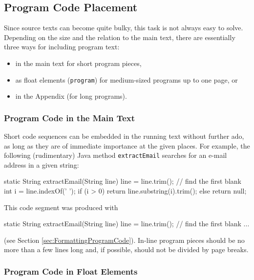 \subsection{Program Code Placement}

Since source texts can become quite bulky, this task is not always easy to
solve. Depending on the size and the relation to the main text, there are
essentially three ways for including program text:
%
\begin{itemize}
    \item[a)] in the main text for short program pieces,
    \item[b)] as float elements (\texttt{program}) for medium-sized programs
    up to one page, or
    \item[c)] in the Appendix (for long programs).
\end{itemize}


\subsubsection{Program Code in the Main Text}

Short code sequences can be embedded in the running text without further ado,
as long as they are of immediate importance at the given places.
For example, the following (rudimentary) Java method \texttt{extractEmail}
searches for an e-mail address in a given string:
%
\begin{JavaCode}[numbers=none]
static String extractEmail(String line) {
    line = line.trim(); // find the first blank
    int i = line.indexOf(' ');
    if (i > 0)
        return line.substring(i).trim();
    else
        return null;
}
\end{JavaCode}
%
\noindent
This code segment was produced with
%
\begin{LaTeXCode}[numbers=none]
\begin{JavaCode}[numbers=none]
static String extractEmail(String line) {
    line = line.trim(); // find the first blank
    ...
}
\end{JavaCode}
\end{LaTeXCode}
%
(see Section \ref{sec:FormattingProgramCode}). In-line program pieces should be
no more than a few lines long and, if possible, should not be divided by page
breaks.


\subsubsection{Program Code in Float Elements}

